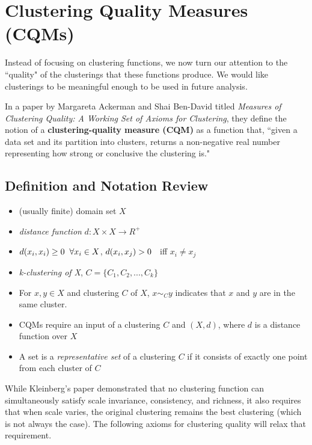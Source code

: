\section{Clustering Quality Measures (CQMs)}

\medskip

Instead of focusing on clustering functions, we now turn our attention to the ``quality" of the clusterings that these functions produce. We would like clusterings to be meaningful enough to be used in future analysis. 

\medskip

In a paper by Margareta Ackerman and Shai Ben-David titled \textit{Measures of Clustering Quality: A Working Set of Axioms for Clustering}, they define the notion of a \textbf{clustering-quality measure (CQM)} as a function that, ``given a data set and its partition into clusters, returns a non-negative real number representing how strong or conclusive the clustering is."

\medskip

\subsection*{Definition and Notation Review}

\begin{itemize}
    \item (usually finite) domain set $X$
    \item \textit{distance function} $d:X \times X \rightarrow R^+$
    \item $d(x_i,x_i)\geq 0 \hspace{0.2cm} \forall x_i \in X$, $d(x_i,x_j)> 0 \hspace{0.2cm}$ iff $x_i \neq x_j$
    \item \textit{k-clustering of X}, $C=\{C_1,C_2,...,C_k\}$
    \item For $x,y\in X$ and clustering $C$ of $X$, $x\sim_C y$ indicates that $x$ and $y$ are in the same cluster.
    \item CQMs require an input of a clustering $C$ and $(X,d)$, where $d$ is a distance function over $X$
    \item A set is a \textit{representative set} of a clustering $C$ if it consists of exactly one point from each cluster of $C$
\end{itemize}

While Kleinberg's paper demonstrated that no clustering function can simultaneously satisfy scale invariance, consistency, and richness, it also requires that when scale varies, the original clustering remains the best clustering (which is not always the case). The following axioms for clustering quality will relax that requirement. 

